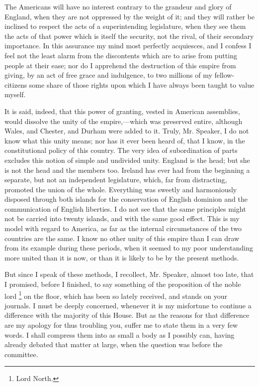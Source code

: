 The Americans will have no interest contrary to the grandeur and glory of England, when they are not oppressed by the weight of it; and they will rather be inclined to respect the acts of a superintending legislature, when they see them the acts of that power which is itself the security, not the rival, of their secondary importance. In this assurance my mind most perfectly acquiesces, and I confess I feel not the least alarm from the discontents which are to arise from putting people at their ease; nor do I apprehend the destruction of this empire from giving, by an act of free grace and indulgence, to two millions of my fellow-citizens some share of those rights upon which I have always been taught to value myself.

It is said, indeed, that this power of granting, vested in American assemblies, would dissolve the unity of the empire,—which was preserved entire, although Wales, and Chester, and Durham were added to it. Truly, Mr. Speaker, I do not know what this unity means; nor has it ever been heard of, that I know, in the constitutional policy of this country. The very idea of subordination of parts excludes this notion of simple and undivided unity. England is the head; but she is not the head and the members too. Ireland has ever had from the beginning a separate, but not an independent legislature, which, far from distracting, promoted the union of the whole. Everything was sweetly and harmoniously disposed through both islands for the conservation of English dominion and the communication of English liberties. I do not see that the same principles might not be carried into twenty islands, and with the same good effect. This is my model with regard to America, as far as the internal circumstances of the two countries are the same. I know no other unity of this empire than I can draw from its example during these periods, when it seemed to my poor understanding more united than it is now, or than it is likely to be by the present methods.

But since I speak of these methods, I recollect, Mr. Speaker, almost too late, that I promised, before I finished, to say something of the proposition of the noble lord
\footnote{Lord North.}
on the floor, which has been so lately received, and stands on your journals. I must be deeply concerned, whenever it is my misfortune to continue a difference with the majority of this House. But as the reasons for that difference are my apology for thus troubling you, suffer me to state them in a very few words. I shall compress them into as small a body as I possibly can, having already debated that matter at large, when the question was before the committee.

